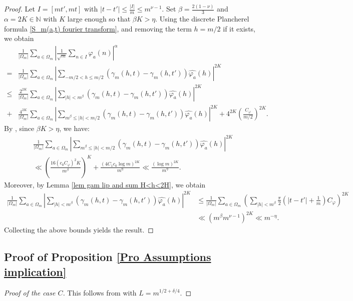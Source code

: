 \documentclass[12pt]{amsart}
\theoremstyle{definition}
\numberwithin{equation}{section}
\numberwithin{equation}{section}
\def\Mp{C_\varphi}
\begin{document}
\begin{proof}Let \(I=[mt',mt]\) with \(|t-t'|\leq \frac{|I|}{m}\leq m^{\nu-1}\). Set 
\(
\beta=\frac{2(1-\nu)}{3} \) and \( \alpha=2K\in\mathbb{N}
\)
with \(K\) large enough so that \(\beta K>\eta\). 
Using the discrete Plancherel formula \eqref{S_m(a,t) fourier transform}, and removing the term \(h=m/2\) if it exists, we obtain
\begin{align*}
    &\frac{1}{|\Omega_m|}\sum_{a\in \Omega_m} \left|
\frac{1}{\sqrt{m}}\sum_{n\in I} \varphi_a(n)\right|^\alpha \\
=& \frac{1}{|\Omega_m|}\sum_{a\in \Omega_m} \left|
\sum_
{-m/2<h\leq  m/2}
(\gamma_m(h,t)-\gamma_m(h,t'))\widehat{\varphi_a}(h)
\right|^{2K}\\
\leq & \frac{2^{2K}}{|\Omega_m|}\sum_{a\in \Omega_m} \left|
\sum_{|h|< m^\beta}
(\gamma_m(h,t)-\gamma_m(h,t'))\widehat{\varphi_a}(h)
\right|^{2K}\\
+& \frac{4^{2K}}{|\Omega_m|}\sum_{a\in \Omega_m} \left|
{\sum_{m^\beta \leq|h|< m/2}}
(\gamma_m(h,t)-\gamma_m(h,t'))\widehat{\varphi_a}(h)
\right|^{2K}+  4^{2K}\left(
\frac{\Mp}{m/2}
\right)^{2K}.
\end{align*}
By \cite[Lemma 6.1]{ABL21}, since $ \beta K>\eta$, we have:
\begin{align*}
&\frac{1}{|\Omega_m|}
\sum_{a\in \Omega_m}
\left|
\sum_{m^\beta \leq|h|< m/2}
(\gamma_m(h,t)-\gamma_m(h,t'))\widehat{\varphi_a}(h)
\right|^{2K }\\ 
&\ll
\left(
\frac{16(c_0 \Mp)^2 K}{m^\beta}
\right)^K
+\frac{(4C_1 c_0\log m)^{2K}}{m^{\eta}}
\ll \frac{(\log m)^{2K}}{m^{\eta}}.
\end{align*}
Moreover, by Lemma \ref{lem gam lip and sum H<h<2H}, we obtain
\begin{align*}
\frac{1}{|\Omega_m|}
\sum_{a\in \Omega_m}
\left| 
\sum_{|h|< m^\beta }
(\gamma_m(h,t)-\gamma_m(h,t'))\widehat{\varphi_a}(h)
\right|^{2K }
&\leq
\frac{1}{|\Omega_m|}
\sum_{a\in \Omega_m}
\left(
\sum_{|h|< m^\beta }
\frac{\pi}{2}\left(|t-t'| +\frac{1}{m} \right)\Mp
\right)^{2K }\\
&\ll 
\left(
m^\beta 
m^{\nu-1} 
\right)^{2K }
\ll m^{-\eta}.
\end{align*}
Collecting the above bounds yields the result.
\end{proof}

\subsection{Proof of Proposition \ref{Pro Assumptions implication}}
\begin{proof}[Proof of the case $C$] This follows from \cite[Lemma 3.1]{ABL21} with $L = m^{1/2+\delta/4}$.
\end{proof}
\end{document}
